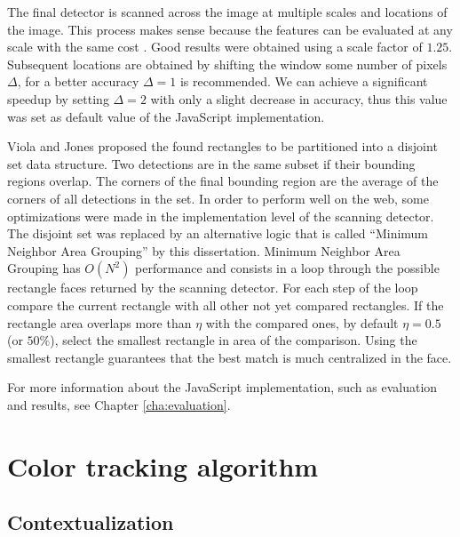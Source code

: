 The final detector is scanned across the image at multiple scales and locations of the image. This process makes sense because the features can be evaluated at any scale with the same cost \cite{Viola2001}. Good results were obtained using a scale factor of $1.25$. Subsequent locations are obtained by shifting the window some number of pixels $\Delta$, for a better accuracy $\Delta=1$ is recommended. We can achieve a significant speedup by setting $\Delta=2$ with only a slight decrease in accuracy, thus this value was set as default value of the JavaScript implementation.

Viola and Jones \cite{Viola2001} proposed the found rectangles to be partitioned into a disjoint set data structure. Two detections are in the same subset if their bounding regions overlap. The corners of the final bounding region are the average of the corners of all detections in the set. In order to perform well on the web, some optimizations were made in the implementation level of the scanning detector. The disjoint set was replaced by an alternative logic that is called ``Minimum Neighbor Area Grouping'' by this dissertation. Minimum Neighbor Area Grouping has $O(N^2)$ performance \cite{black2007big} and consists in a loop through the possible rectangle faces returned by the scanning detector. For each step of the loop compare the current rectangle with all other not yet compared rectangles. If the rectangle area overlaps more than $\eta$ with the compared ones, by default $\eta=0.5$ (or $50\%$), select the smallest rectangle in area of the comparison. Using the smallest rectangle guarantees that the best match is much centralized in the face.

For more information about the JavaScript implementation, such as evaluation and results, see Chapter \ref{cha:evaluation}.



\section{Color tracking algorithm} %
\label{sec:tracking_library_for_the_web:color_tracking_algorithm}

\subsection{Contextualization} %
\label{sub:tracking_library_for_the_web:color_tracking_algorithm:contextualization}

